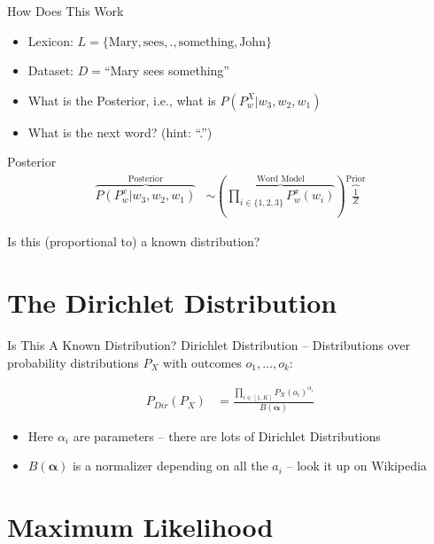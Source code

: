 \documentclass[11pt]{beamer}
\begin{document}
	\begin{frame}{How Does This Work}
		\begin{itemize}
			\item Lexicon: $L = \lbrace \text{Mary}, \text{sees}, \text{.}, \text{something}, \text{John}  \rbrace$
			\item Dataset: $D=$``Mary sees something''
			\item What is the Posterior, i.e., what is $P(P_{w}^X \vert w_3,w_2,w_1)$
			\item What is the next word? (hint: ``.'')
		\end{itemize}
	\end{frame}
	
	\begin{frame}{Posterior}
		\begin{align*}
			\overbrace{P(P_{w}^x \vert w_3,w_2,w_1)}^{\text{Posterior}} & \sim \left(\overbrace{\prod_{i \in \{1,2,3\}} P_{w}^{x}(w_i)}^{\text{Word Model}}\right) \overbrace{\frac{1}{Z}}^{\text{Prior}}
		\end{align*}
		
		\vspace{10pt} Is this (proportional to) a known distribution?
	\end{frame}
	
	\section{The Dirichlet Distribution}
	
	\begin{frame}{Is This A Known Distribution?}
		Dirichlet Distribution -- Distributions over probability distributions $P_X$ with outcomes $o_1,\dots,o_k$:
		
		\begin{align*}
			P_{Dir}(P_X) & = \frac{\prod_{i \in [1,K]} P_{X}(o_i)^{\alpha_i}}{B(\boldsymbol{\alpha})}
		\end{align*}
		
		\vspace{10pt} \begin{itemize}
			\item Here	$\alpha_i$ are parameters -- there are lots of Dirichlet Distributions
			\item $B(\boldsymbol{\alpha})$ is a normalizer depending on all the $a_i$ -- look it up on Wikipedia
		\end{itemize}
	\end{frame}
	
	\section{Maximum Likelihood}
	
\end{document}
